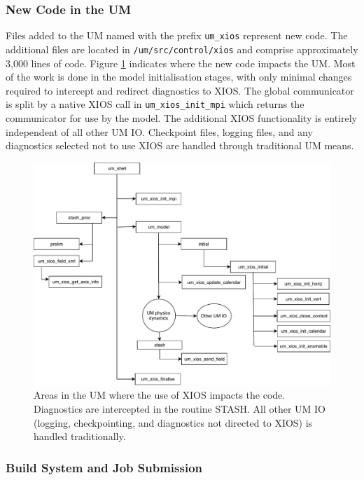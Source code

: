 \documentclass[twocolumn, 12pt]{paper}
\begin{document}
\subsubsection{New Code in the UM}
\label{new-code}

Files added to the UM named with the prefix \texttt{um\_xios} represent new code.
The additional files are located in \texttt{/um/src/control/xios} and comprise approximately 3,000 lines of code.
Figure \ref{um-xios-code} indicates where the new code impacts the UM.
Most of the work is done in the model initialisation stages, with only minimal changes required to intercept and redirect diagnostics to XIOS.
The global communicator is split by a native XIOS call in \texttt{um\_xios\_init\_mpi} which returns the communicator for use by the model.
The additional XIOS functionality is entirely independent of all other UM IO.
Checkpoint files, logging files, and any diagnostics selected not to use XIOS are handled through traditional UM means.

\begin{figure}[H]
	\centerline{
	\includegraphics[scale=0.5]{figures/UM-XIOS-code.pdf}}
	\caption {Areas in the UM where the use of XIOS impacts the code. Diagnostics are intercepted in the routine STASH. All other UM IO (logging, checkpointing, and diagnostics not directed to XIOS) is handled traditionally.}
	\label{um-xios-code}
\end{figure}


\subsubsection{Build System and Job Submission}
\end{document}
